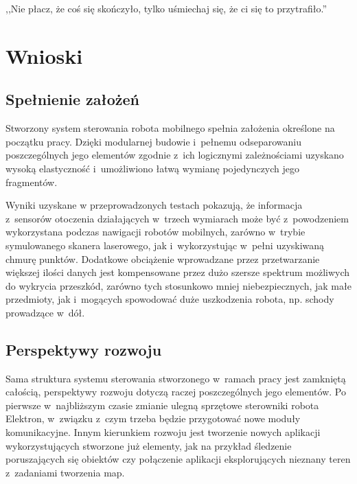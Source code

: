 

\begin{savequote}[70mm]
,,Nie płacz, że coś się skończyło, tylko uśmiechaj się, że ci się to przytrafiło.''
\end{savequote}


\chapter{Wnioski}
\label{chap:wnioski}

\section{Spełnienie założeń}

Stworzony system sterowania robota mobilnego spełnia założenia określone na początku pracy.
Dzięki modularnej budowie i~pełnemu odseparowaniu poszczególnych jego elementów
zgodnie z~ich logicznymi zależnościami uzyskano wysoką elastyczność i~umożliwiono
łatwą wymianę pojedynczych jego fragmentów.

Wyniki uzyskane w przeprowadzonych testach pokazują, że informacja z~sensorów otoczenia
działających w~trzech wymiarach może być z~powodzeniem wykorzystana podczas nawigacji
robotów mobilnych, zarówno w~trybie symulowanego skanera laserowego, jak i~wykorzystując
w~pełni uzyskiwaną chmurę punktów. Dodatkowe obciążenie wprowadzane przez przetwarzanie
większej ilości danych jest kompensowane przez dużo szersze spektrum możliwych do
wykrycia przeszkód, zarówno tych stosunkowo mniej niebezpiecznych, jak małe przedmioty,
jak i~mogących spowodować duże uszkodzenia robota, np. schody prowadzące w~dół.


\section{Perspektywy rozwoju}

Sama struktura systemu sterowania stworzonego w~ramach pracy jest zamkniętą całością,
perspektywy rozwoju dotyczą raczej poszczególnych jego elementów. Po pierwsze w~najbliższym
czasie zmianie ulegną sprzętowe sterowniki robota Elektron, w~związku z~czym trzeba będzie
przygotować nowe moduły komunikacyjne. Innym kierunkiem rozwoju jest tworzenie nowych
aplikacji wykorzystujących stworzone już elementy, jak na przykład śledzenie poruszających
się obiektów czy połączenie aplikacji eksplorujących nieznany teren z~zadaniami tworzenia
map.

